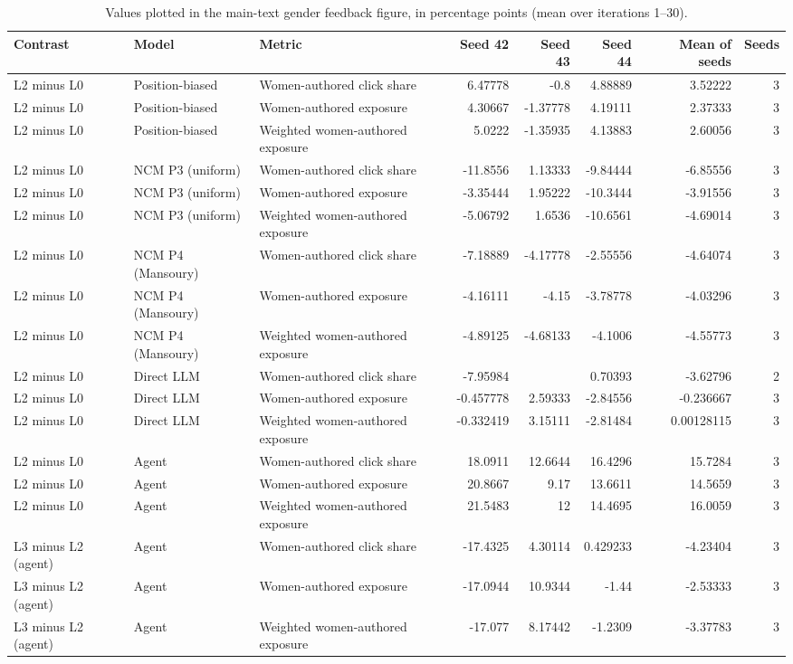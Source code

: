 \begin{table}[htbp!]
\centering
\small
\setlength{\tabcolsep}{3pt}
\renewcommand{\arraystretch}{1.1}
\begin{tabular}{lllrrrrr}
\hline
Contrast & Model & Metric & Seed 42 & Seed 43 & Seed 44 & Mean of seeds & Seeds \\
\hline
L2 minus L0 & Position-biased & Women-authored click share & 6.47778 & -0.8 & 4.88889 & 3.52222 & 3 \\
L2 minus L0 & Position-biased & Women-authored exposure & 4.30667 & -1.37778 & 4.19111 & 2.37333 & 3 \\
L2 minus L0 & Position-biased & Weighted women-authored exposure & 5.0222 & -1.35935 & 4.13883 & 2.60056 & 3 \\
L2 minus L0 & NCM P3 (uniform) & Women-authored click share & -11.8556 & 1.13333 & -9.84444 & -6.85556 & 3 \\
L2 minus L0 & NCM P3 (uniform) & Women-authored exposure & -3.35444 & 1.95222 & -10.3444 & -3.91556 & 3 \\
L2 minus L0 & NCM P3 (uniform) & Weighted women-authored exposure & -5.06792 & 1.6536 & -10.6561 & -4.69014 & 3 \\
L2 minus L0 & NCM P4 (Mansoury) & Women-authored click share & -7.18889 & -4.17778 & -2.55556 & -4.64074 & 3 \\
L2 minus L0 & NCM P4 (Mansoury) & Women-authored exposure & -4.16111 & -4.15 & -3.78778 & -4.03296 & 3 \\
L2 minus L0 & NCM P4 (Mansoury) & Weighted women-authored exposure & -4.89125 & -4.68133 & -4.1006 & -4.55773 & 3 \\
L2 minus L0 & Direct LLM & Women-authored click share & -7.95984 & \textemdash{} & 0.70393 & -3.62796 & 2 \\
L2 minus L0 & Direct LLM & Women-authored exposure & -0.457778 & 2.59333 & -2.84556 & -0.236667 & 3 \\
L2 minus L0 & Direct LLM & Weighted women-authored exposure & -0.332419 & 3.15111 & -2.81484 & 0.00128115 & 3 \\
L2 minus L0 & Agent & Women-authored click share & 18.0911 & 12.6644 & 16.4296 & 15.7284 & 3 \\
L2 minus L0 & Agent & Women-authored exposure & 20.8667 & 9.17 & 13.6611 & 14.5659 & 3 \\
L2 minus L0 & Agent & Weighted women-authored exposure & 21.5483 & 12 & 14.4695 & 16.0059 & 3 \\
L3 minus L2 (agent) & Agent & Women-authored click share & -17.4325 & 4.30114 & 0.429233 & -4.23404 & 3 \\
L3 minus L2 (agent) & Agent & Women-authored exposure & -17.0944 & 10.9344 & -1.44 & -2.53333 & 3 \\
L3 minus L2 (agent) & Agent & Weighted women-authored exposure & -17.077 & 8.17442 & -1.2309 & -3.37783 & 3 \\
\hline
\end{tabular}
\caption{Values plotted in the main-text gender feedback figure, in percentage points (mean over iterations 1--30).}
\label{chap:results:tab:main_rq7_gender_feedback_effects_values}
\end{table}
